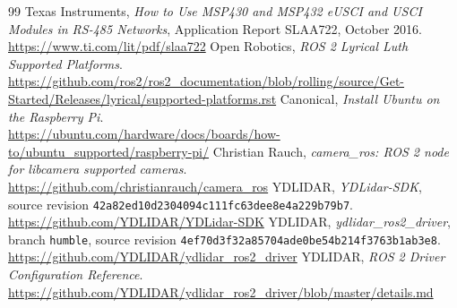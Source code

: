 \begin{thebibliography}{99}
Texas Instruments,
\emph{How to Use MSP430 and MSP432 eUSCI and USCI Modules in RS-485 Networks},
Application Report SLAA722, October 2016.\\
\url{https://www.ti.com/lit/pdf/slaa722}
Open Robotics,
\emph{ROS 2 Lyrical Luth Supported Platforms}.\\
\url{https://github.com/ros2/ros2_documentation/blob/rolling/source/Get-Started/Releases/lyrical/supported-platforms.rst}
Canonical,
\emph{Install Ubuntu on the Raspberry Pi}.\\
\url{https://ubuntu.com/hardware/docs/boards/how-to/ubuntu_supported/raspberry-pi/}
Christian Rauch,
\emph{camera\_ros: ROS 2 node for libcamera supported cameras}.\\
\url{https://github.com/christianrauch/camera_ros}
YDLIDAR,
\emph{YDLidar-SDK}, source revision \texttt{42a82ed10d2304094c111fc63dee8e4a229b79b7}.\\
\url{https://github.com/YDLIDAR/YDLidar-SDK}
YDLIDAR,
\emph{ydlidar\_ros2\_driver}, branch \texttt{humble}, source revision \texttt{4ef70d3f32a85704ade0be54b214f3763b1ab3e8}.\\
\url{https://github.com/YDLIDAR/ydlidar_ros2_driver}
YDLIDAR,
\emph{ROS 2 Driver Configuration Reference}.\\
\url{https://github.com/YDLIDAR/ydlidar_ros2_driver/blob/master/details.md}
\end{thebibliography}
